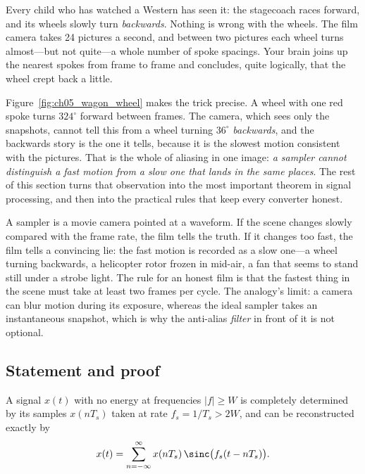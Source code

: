 Every child who has watched a Western has seen it: the stagecoach races forward, and its wheels
slowly turn \emph{backwards}. Nothing is wrong with the wheels. The film camera takes 24
pictures a second, and between two pictures each wheel turns almost---but not quite---a whole
number of spoke spacings. Your brain joins up the nearest spokes from frame to frame and
concludes, quite logically, that the wheel crept back a little.

Figure~\ref{fig:ch05_wagon_wheel} makes the trick precise. A wheel with one red spoke turns
$324^\circ$ forward between frames. The camera, which sees only the snapshots, cannot tell this
from a wheel turning $36^\circ$ \emph{backwards}, and the backwards story is the one it tells,
because it is the slowest motion consistent with the pictures. That is the whole of aliasing in
one image: \emph{a sampler cannot distinguish a fast motion from a slow one that lands in the same
places}. The rest of this section turns that observation into the most important theorem in
signal processing, and then into the practical rules that keep every converter honest.


\begin{analogy}
A sampler is a movie camera pointed at a waveform. If the scene changes slowly compared with the
frame rate, the film tells the truth. If it changes too fast, the film tells a convincing lie:
the fast motion is recorded as a slow one---a wheel turning backwards, a helicopter rotor frozen in
mid-air, a fan that seems to stand still under a strobe light. The rule for an honest film is that
the fastest thing in the scene must take at least two frames per cycle. The analogy's limit: a
camera can blur motion during its exposure, whereas the ideal sampler takes an instantaneous
snapshot, which is why the anti-alias \emph{filter} in front of it is not optional.
\end{analogy}

\subsection{Statement and proof}

\begin{keyidea}[title=The sampling theorem]
A signal $x(t)$ with no energy at frequencies $|f|\ge W$ is completely determined by its
samples $x(nT_s)$ taken at rate $f_s=1/T_s>2W$, and can be reconstructed exactly by
\begin{equation}
x(t)=\sum_{n=-\infty}^{\infty}x(nT_s)\,\sinc\big(f_s(t-nT_s)\big).
\label{eq:ch05:interp}
\end{equation}
\end{keyidea}

